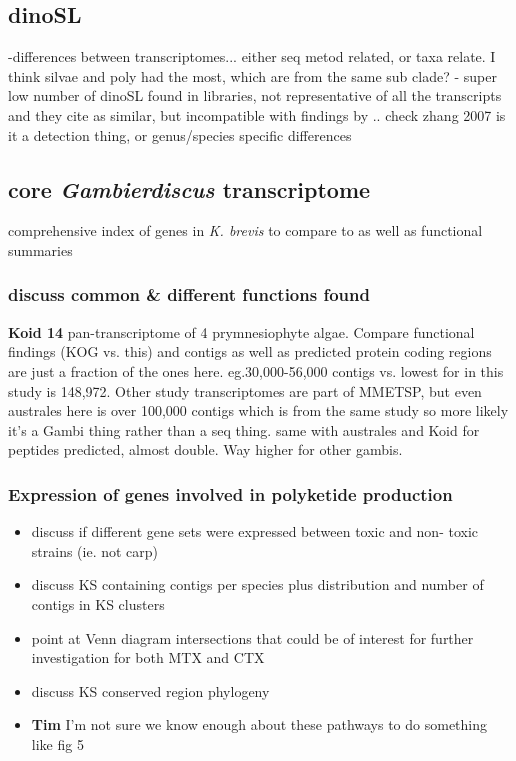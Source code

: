 \documentclass[12pt]{article}
\begin{document}
\subsection{dinoSL}
-differences between transcriptomes... either seq metod related, or taxa relate. I think silvae and poly had the most, which are from the same sub clade?
- super low number of dinoSL found in libraries, not representative of all the transcripts \cite{guo2011spliced} and they cite \cite{bachvaroff2008stop} as similar, but incompatible with findings by \cite{zhang2009retrieval}.. check zhang 2007 is it a detection thing, or genus/species specific differences
\subsection*{core \textit{Gambierdiscus} transcriptome}
 \cite{lidie2005gene} comprehensive index of genes in \textit{K. brevis} to compare to as well as functional summaries 

\subsubsection*{discuss common \& different functions found}
\textbf{Koid 14} pan-transcriptome of 4 prymnesiophyte algae. 
Compare functional findings (KOG vs. this) and contigs as well as predicted protein coding regions are just a fraction of the ones here. 
eg.30,000-56,000 contigs vs. lowest for in this study is 148,972. 
Other study transcriptomes are part of MMETSP, but even australes here is over 100,000 contigs which is from the same study so more likely it's a Gambi thing rather than a seq thing.
same with australes and Koid for peptides predicted, almost double. 
Way higher for other gambis.\\


\subsubsection*{Expression of genes involved in polyketide production}
\begin{itemize}
\item discuss if different gene sets were expressed between toxic and non- toxic strains (ie. not carp)
\item discuss KS containing contigs per species plus distribution and number of contigs in KS clusters
\item point at Venn diagram intersections that could be of interest for further investigation for both MTX and CTX
\item discuss KS conserved region phylogeny
\item \textbf{Tim} I'm not sure we know enough about these pathways to do something like fig 5 
\end{itemize}
\end{document}
